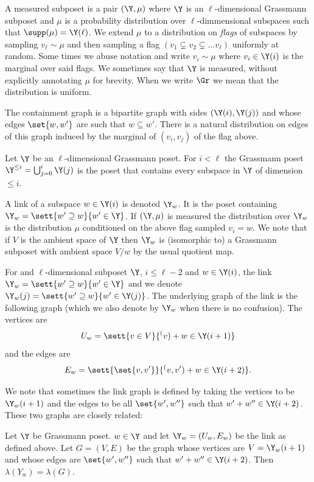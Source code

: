 A measured subposet is a pair \((\Y,\mu)\) where \(\Y\) is an \(\ell\)-dimensional Grassmann subposet and \(\mu\) is a probability distribution over \(\ell\)-dimmensional subspaces such that \(\supp(\mu) = \Y(\ell)\). We extend \(\mu\) to a distribution on \emph{flags} of subspaces by sampling \(v_\ell \sim \mu\) and then sampling a flag \((v_1 \subsetneq v_2 \subsetneq \dots v_\ell)\) uniformly at random. Some times we abuse notation and write \(v_i \sim \mu\) where \(v_i \in \Y(i)\) is the marginal over said flags. We sometimes say that \(\Y\) is measured, without explicitly annotating \(\mu\) for brevity. When we write \(\Gr\) we mean that the distribution is uniform.

The containment graph is a bipartite graph with sides \((\Y(i),\Y(j))\) and whose edges \(\set{w,w'}\) are such that \(w \subseteq w'\). There is a natural distribution on edges of this graph induced by the marginal of \((v_i,v_j)\) of the flag above.

Let \(\Y\) be an \(\ell\)-dimensional Grassmann poset. For \(i < \ell\) the Grassmann poset \(\Y^{\leq i} = \bigcup_{j=0}^i \Y(j)\) is the poset that contains every subspace in \(\Y\) of dimension \(\leq i\).

A link of a subspace \(w \in \Y(i)\) is denoted \(\Y_w\). It is the poset containing \(\Y_w = \sett{w' \supseteq w}{w' \in \Y}\). If \((\Y,\mu)\) is measured the distribution over \(\Y_w\) is the distribution \(\mu\) conditioned on the above flag sampled \(v_i = w\). We note that if \(V\) is the ambient space of \(\Y\) then \(\Y_w\) is (isomorphic to) a Grassmann subposet with ambient space \(V/w\) by the usual quotient map.

For and \(\ell\)-dimensional subposet \(\Y\), \(i \leq \ell-2\) and \(w \in \Y(i)\), the link \(\Y_w = \sett{w' \supseteq w}{w' \in \Y}\) and we denote \(\Y_w(j) = \sett{w' \supseteq w}{w' \in \Y(j)}\). The underlying graph of the link is the following graph (which we also denote by \(\Y_w\) when there is no confusion). The vertices are
\[U_w = \sett{v \in V}{\sp(v) + w \in \Y(i+1)}\]
and the edges are
\[E_w = \sett{\set{v,v'}}{\sp(v,v') + w \in \Y(i+2)}.\]

We note that sometimes the link graph is defined by taking the vertices to be \(\Y_w(i+1)\) and the edges to be all \(\set{w',w''}\) such that \(w'+w'' \in \Y(i+2)\). These two graphs are closely related: 
\begin{claim} \label{claim:smaller-vs-bigger-link-defs}
    Let \(\Y\) be Grassmann poset. \(w \in \Y\) and let \(\Y_w=(U_w,E_w)\) be the link as defined above. Let \(G = (V,E)\) be the graph whose vertices are \(V = \Y_w(i+1)\) and whose edges are \(\set{w',w''}\) such that \(w'+w'' \in \Y(i+2)\). Then \(\lambda(Y_w) = \lambda(G)\).
\end{claim}

